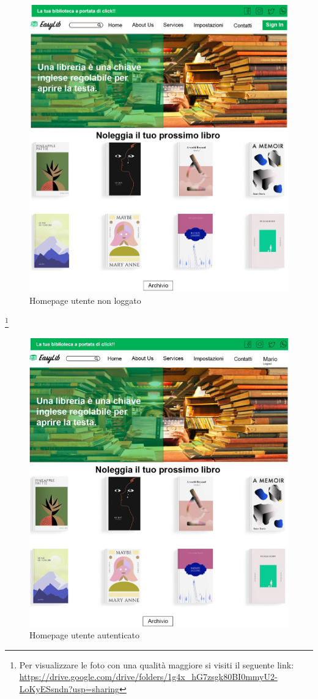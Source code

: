 \documentclass{article}
\begin{document}
\begin{figure}[H]
    \centering
    \includegraphics[width=130mm]{D1/Images/Anonimo.png}
    \caption{Homepage utente non loggato}
\end{figure}
\footnote{Per visualizzare le foto con una qualità maggiore si visiti il seguente link:\\ \url{https://drive.google.com/drive/folders/1g4x_hG7zsgk80BI0mmyU2-LoKyESsndn?usp=sharing}}

\begin{figure}[H]
    \centering
    \includegraphics[width=130mm]{D1/Images/Homepage.png}
    \caption{Homepage utente autenticato}
\end{figure}
\end{document}
